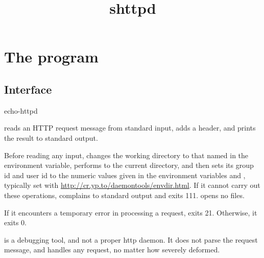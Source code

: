 \documentclass{book}
\title{shttpd}
\begin{document}
\section{The  program}

\subsection{Interface}
\begin{code}
  echo-httpd
\end{code}

 reads an HTTP request message from standard input,
adds a header, and prints the result to standard output.

Before reading any input,  changes the working
directory to that named in the  environment variable,
performs  to the current directory, and then sets its
group id and user id to the numeric values given in the environment
variables  and , typically set with
\href{\cmd{envdir}}{http://cr.yp.to/daemontools/envdir.html}.
If it cannot carry out these operations,  complains to
standard output and exits 111.   opens no files.

If it encounters a temporary error in processing a request,
 exits 21.  Otherwise, it exits 0.

 is a debugging tool, and not a proper http daemon.
It does not parse the request message, and handles any request, no
matter how severely deformed.
\end{document}
